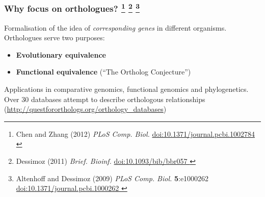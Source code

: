 % 
\begin{frame}
  \frametitle{Why focus on orthologues?
    \footnote{\tiny{Chen and Zhang (2012) \textit{PLoS Comp. Biol.} \href{http://dx.doi.org/10.1371/journal.pcbi.1002784}{doi:10.1371/journal.pcbi.1002784
    }}}  
    \footnote{\tiny{Dessimoz (2011) \textit{Brief. Bioinf.} \href{http://dx.doi.org/10.1093/bib/bbr057}{doi:10.1093/bib/bbr057
    }}}
    \footnote{\tiny{Altenhoff and Dessimoz (2009) \textit{PLoS Comp. Biol.} \textbf{5}:e1000262 \href{http://dx.doi.org/10.1371/journal.pcbi.1000262}{doi:10.1371/journal.pcbi.1000262
    }}}
  }
  Formalisation of the idea of \textit{corresponding genes} in different organisms. \\
  \textcolor{hutton_blue}{Orthologues serve two purposes:}
  \begin{itemize}
    \item \textcolor{hutton_green}{\textbf{Evolutionary equivalence}}
    \item \textcolor{hutton_purple}{\textbf{Functional equivalence}} (``The Ortholog Conjecture'')
  \end{itemize}
  Applications in comparative genomics, functional genomics and phylogenetics. \\
  \textcolor{RawSienna}{Over 30 databases attempt to describe orthologous relationships} (\href{http://questfororthologs.org/orthology_databases
}{http://questfororthologs.org/orthology\_databases})
\end{frame}

